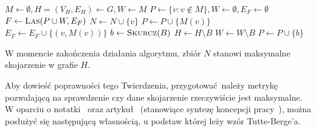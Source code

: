 {\begin{algorithm}
\begin{algorithmic}[1]
        \State $M \gets \emptyset, H=(V_H, E_H) \gets G, W \gets M$
        \State $P \gets \{v: v \notin M\}, W \gets \emptyset, E_F \gets \emptyset$\label{init_edmonds}
        \State $F \gets \Call{Las}{P \cup W, E_F}$
        \label{pick_edge}
        \EndIf
        \label{put_matched_in_odd}
          \State $N \gets N \cup \{v\}$
          \State $P \gets P \cup \{M(v)\}$
          \State $E_F \gets E_F \cup \{(v, M(v))\}$
        \label{even_connected}
          \State $b \gets \Call{Skurcz}{B}$
          \State $H \gets H\setminus B$
          \State $W \gets W\setminus B$
          \State $P \gets P \cup \{b\}$
        \label{even_disjoint}
          \State{}
        \EndIf
      \EndFunction
    \end{algorithmic}
  \end{algorithm}
  \begin{theorem}
    W momencie zakończenia działania algorytmu, zbiór $N$ stanowi maksymalne skojarzenie w grafie $H$.
  \end{theorem}
  Aby dowieść poprawności tego Twierdzenia, przygotować należy metrykę pozwalającą na sprawdzenie czy dane skojarzenie rzeczywiście jest maksymalne.
  W oparciu o notatki~\cite{Tutte-Berge:notes} oraz artykuł~\cite{cohen:hal-00358468} (stanowiące syntezę koncepcji pracy~\cite{Tutte-Berge:original}),  można posłużyć się następującą własnością, u podstaw której leży wzór Tutte-Berge'a.

}
